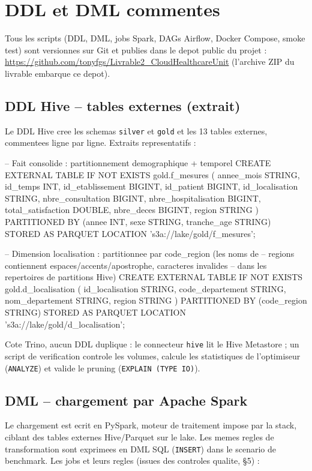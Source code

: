 \documentclass[11pt,a4paper]{article}
\begin{document}
\section{DDL et DML commentes}

Tous les scripts (DDL, DML, jobs Spark, DAGs Airflow, Docker Compose, smoke test)
sont versionnes sur Git et publies dans le depot public du projet :
\url{https://github.com/tonyfgs/Livrable2_CloudHealthcareUnit} (l'archive ZIP du
livrable embarque ce depot).

\subsection{DDL Hive -- tables externes (extrait)}
Le DDL Hive cree les schemas \texttt{silver} et \texttt{gold} et les 13 tables
externes, commentees ligne par ligne. Extraits representatifs :

\begin{sqlcode}
-- Fait consolide : partitionnement demographique + temporel
CREATE EXTERNAL TABLE IF NOT EXISTS gold.f_mesures (
  annee_mois STRING, id_temps INT, id_etablissement BIGINT,
  id_patient BIGINT, id_localisation STRING,
  nbre_consultation BIGINT, nbre_hospitalisation BIGINT,
  total_satisfaction DOUBLE, nbre_deces BIGINT, region STRING
)
PARTITIONED BY (annee INT, sexe STRING, tranche_age STRING)
STORED AS PARQUET
LOCATION 's3a://lake/gold/f_mesures';

-- Dimension localisation : partitionnee par code_region (les noms de
-- regions contiennent espaces/accents/apostrophe, caracteres invalides
-- dans les repertoires de partitions Hive)
CREATE EXTERNAL TABLE IF NOT EXISTS gold.d_localisation (
  id_localisation STRING, code_departement STRING,
  nom_departement STRING, region STRING
)
PARTITIONED BY (code_region STRING)
STORED AS PARQUET
LOCATION 's3a://lake/gold/d_localisation';
\end{sqlcode}

Cote Trino, aucun DDL duplique : le connecteur \texttt{hive} lit le Hive
Metastore ; un script de verification controle les volumes, calcule les
statistiques de l'optimiseur (\texttt{ANALYZE}) et valide le pruning
(\texttt{EXPLAIN (TYPE IO)}).

\subsection{DML -- chargement par Apache Spark}
Le chargement est ecrit en PySpark, moteur de traitement impose par la stack,
ciblant des tables externes Hive/Parquet sur le lake. Les memes regles de
transformation sont exprimees en DML SQL (\texttt{INSERT}) dans le scenario de
benchmark. Les jobs et leurs regles (issues des controles qualite, \S5) :
\end{document}
